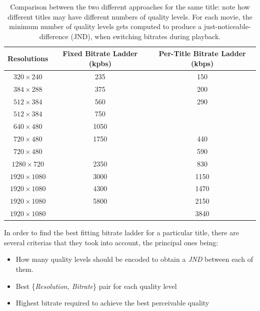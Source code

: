 \begin{table}[htb]
  \centering
  \begin{tabular}{|c|c|c|}
    \hline
    \textbf{Resolutions} & \textbf{Fixed Bitrate Ladder (kpbs)} & \textbf{Per-Title Bitrate Ladder (kbps)} \\
    \hline
    $320\times240$       & 235                                  & 150 \\
    \hline
    $384\times288$       & 375                                  & 200 \\
    \hline
    $512\times384$       & 560                                  & 290 \\
    \hline
    $512\times384$       & 750                                  & \\
    \hline
    $640\times480$       & 1050                                 & \\
    \hline
    $720\times480$       & 1750                                 & 440\\
    \hline
    $720\times480$       &                                      & 590\\
    \hline
    $1280\times720$      & 2350                                 & 830\\
    \hline
    $1920\times1080$     & 3000                                 & 1150\\
    \hline
    $1920\times1080$     & 4300                                 & 1470\\
    \hline
    $1920\times1080$     & 5800                                 & 2150\\
    \hline
    $1920\times1080$     &                                      & 3840\\
    \hline
  \end{tabular}
  \caption{
    Comparison between the two different approaches for the same title: note
    how different titles may have different numbers of quality levels. For each
    movie, the minimum number of quality levels gets computed to produce a
    just-noticeable-difference (JND), when switching bitrates during playback.
  }
  \label{tab:old-vs-new-ladder}
\end{table}

In order to find the best fitting bitrate ladder for a particular title, there
are several criterias that they took into account, the principal ones being:

\begin{itemize}
    \item How many quality levels should be encoded to obtain a
          \emph{JND} between each of them.
    \item Best \{\emph{Resolution, Bitrate}\} pair for each quality level
    \item Highest bitrate required to achieve the best perceivable quality
\end{itemize}

